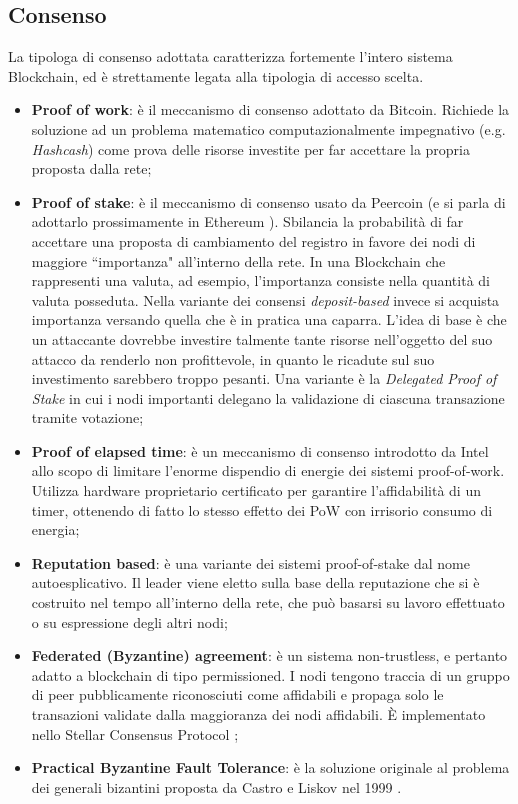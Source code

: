 	\subsection{Consenso}
		La tipologa di consenso adottata caratterizza fortemente l'intero sistema Blockchain, ed è strettamente legata alla tipologia di accesso scelta.
		\begin{itemize}
			\item \textbf{Proof of work}: è il meccanismo di consenso adottato da Bitcoin. Richiede la soluzione ad un problema matematico computazionalmente impegnativo (e.g. \emph{Hashcash}) come prova delle risorse investite per far accettare la propria proposta dalla rete;
			\item \textbf{Proof of stake}: è il meccanismo di consenso usato da Peercoin (e si parla di adottarlo prossimamente in Ethereum \cite{casper}). Sbilancia la probabilità di far accettare una proposta di cambiamento del registro in favore dei nodi di maggiore ``importanza" all'interno della rete. In una Blockchain che rappresenti una valuta, ad esempio, l'importanza consiste nella quantità di valuta posseduta. Nella variante dei consensi \emph{deposit-based} invece si acquista importanza versando quella che è in pratica una caparra. L'idea di base è che un attaccante dovrebbe investire talmente tante risorse nell'oggetto del suo attacco da renderlo non profittevole, in quanto le ricadute sul suo investimento sarebbero troppo pesanti. Una variante è la \emph{Delegated Proof of Stake} in cui i nodi importanti delegano la validazione di ciascuna transazione tramite votazione;
			\item \textbf{Proof of elapsed time}: è un meccanismo di consenso introdotto da Intel \cite{poet} allo scopo di limitare l'enorme dispendio di energie dei sistemi proof-of-work. Utilizza hardware proprietario certificato per garantire l'affidabilità di un timer, ottenendo di fatto lo stesso effetto dei PoW con irrisorio consumo di energia;
			\item \textbf{Reputation based}: è una variante dei sistemi proof-of-stake dal nome autoesplicativo. Il leader viene eletto sulla base della reputazione che si è costruito nel tempo all'interno della rete, che può basarsi su lavoro effettuato o su espressione degli altri nodi;
			\item \textbf{Federated (Byzantine) agreement}: è un sistema non-trustless, e pertanto adatto a blockchain di tipo permissioned. I nodi tengono traccia di un gruppo di peer pubblicamente riconosciuti come affidabili e propaga solo le transazioni validate dalla maggioranza dei nodi affidabili. È implementato nello Stellar Consensus Protocol \cite{stellar_protocol}; 
			\item \textbf{Practical Byzantine Fault Tolerance}: è la soluzione originale al problema dei generali bizantini proposta da Castro e Liskov nel 1999 \cite{PBFT}.
		\end{itemize}

